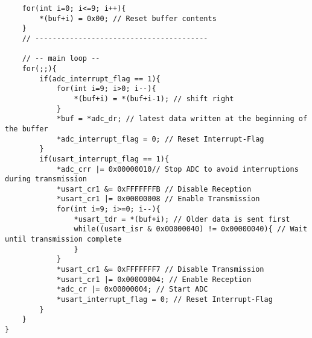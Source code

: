 \documentclass[11pt]{report}
\begin{document}
\begin{lstlisting}
	for(int i=0; i<=9; i++){
		*(buf+i) = 0x00; // Reset buffer contents
	}
	// ----------------------------------------
	
	// -- main loop --
	for(;;){
		if(adc_interrupt_flag == 1){
			for(int i=9; i>0; i--){
				*(buf+i) = *(buf+i-1); // shift right
			}
			*buf = *adc_dr; // latest data written at the beginning of the buffer
			*adc_interrupt_flag = 0; // Reset Interrupt-Flag
		}
		if(usart_interrupt_flag == 1){
			*adc_crr |= 0x00000010// Stop ADC to avoid interruptions during transmission
			*usart_cr1 &= 0xFFFFFFFB // Disable Reception
			*usart_cr1 |= 0x00000008 // Enable Transmission
			for(int i=9; i>=0; i--){
				*usart_tdr = *(buf+i); // Older data is sent first
				while((usart_isr & 0x00000040) != 0x00000040){ // Wait until transmission complete
				}
			}
			*usart_cr1 &= 0xFFFFFFF7 // Disable Transmission
			*usart_cr1 |= 0x00000004; // Enable Reception
			*adc_cr |= 0x00000004; // Start ADC
			*usart_interrupt_flag = 0; // Reset Interrupt-Flag
		}
	}
}
	\end{lstlisting}
\end{document}
